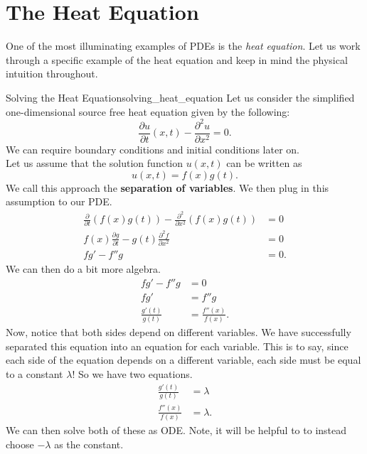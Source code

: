     
        \section{The Heat Equation}
        One of the most illuminating examples of PDEs is the \emph{heat equation}.  Let us work through a specific example of the heat equation and keep in mind the physical intuition throughout.
        
        \begin{ex}{Solving the Heat Equation}{solving_heat_equation}
        Let us consider the simplified one-dimensional source free heat equation given by the following:
        \[
        \frac{\partial u}{\partial t}(x,t)-\frac{\partial^2 u}{\partial x^2} = 0.
        \]
        We can require boundary conditions and initial conditions later on.\\
        
        Let us assume that the solution function $u(x,t)$ can be written as
        \[
        u(x,t) = f(x)g(t).
        \]
        We call this approach the \textbf{separation of variables}. We then plug in this assumption to our PDE.
        \begin{align*}
            \frac{\partial}{\partial t} (f(x)g(t))-\frac{\partial^2}{\partial x^2} (f(x)g(t)) &= 0\\
            f(x)\frac{\partial g}{\partial t}-g(t)\frac{\partial^2 f}{\partial x^2}&=0\\
            fg'-f''g &=0.
        \end{align*}
        We can then do a bit more algebra.
        \begin{align*}
            fg'-f''g&=0\\
            fg'&= f''g\\
            \frac{g'(t)}{g(t)}&=\frac{f''(x)}{f(x)}.
        \end{align*}
        Now, notice that both sides depend on different variables.  We have successfully separated this equation into an equation for each variable.  This is to say, since each side of the equation depends on a different variable, each side must be equal to a constant $\lambda$! So we have two equations.
        \begin{align*}
            \frac{g'(t)}{g(t)}&=\lambda\\
            \frac{f''(x)}{f(x)}&=\lambda.
        \end{align*}
        We can then solve both of these as ODE. Note, it will be helpful to to instead choose $-\lambda$ as the constant.
        \end{ex}
        
